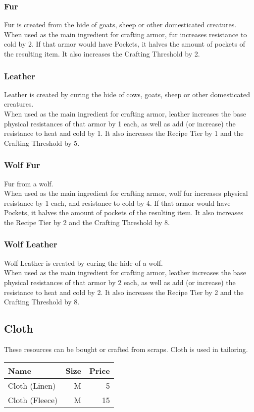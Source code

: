 \subsubsection{Fur}
Fur is created from the hide of goats, sheep or other domesticated creatures.\\
When used as the main ingredient for crafting armor, fur increases resistance to cold by 2.
If that armor would have Pockets, it halves the amount of pockets of the resulting item.
It also increases the Crafting Threshold by 2.

\subsubsection{Leather}
Leather is created by curing the hide of cows, goats, sheep or other domesticated creatures.\\
When used as the main ingredient for crafting armor, leather increases the base physical resistances of that armor by 1 each, as well as add (or increase) the resistance to heat and cold by 1.
It also increases the Recipe Tier by 1 and the Crafting Threshold by 5.

\subsubsection{Wolf Fur}
Fur from a wolf.\\
When used as the main ingredient for crafting armor, wolf fur increases physical resistance by 1 each, and resistance to cold by 4.
If that armor would have Pockets, it halves the amount of pockets of the resulting item.
It also increases the Recipe Tier by 2 and the Crafting Threshold by 8.

\subsubsection{Wolf Leather}
Wolf Leather is created by curing the hide of a wolf.\\
When used as the main ingredient for crafting armor, leather increases the base physical resistances of that armor by 2 each, as well as add (or increase) the resistance to heat and cold by 2.
It also increases the Recipe Tier by 2 and the Crafting Threshold by 8.

\subsection{Cloth}\label{subsec:cloth}
These resources can be bought or crafted from scraps.
Cloth is used in tailoring.
\begin{longtable}{l | r | r }
	Name & Size & Price\\ \hline
	Cloth (Linen) & M & 5\\
	Cloth (Fleece) & M & 15\\
\end{longtable}

